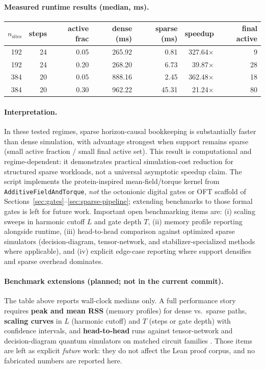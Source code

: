 \documentclass[11pt,a4paper]{article}
\theoremstyle{remark}
\begin{document}
\paragraph{Measured runtime results (median, ms).}
\begin{center}
\begin{tabular}{|r|r|r|r|r|r|r|}
\hline
$n_{\text{sites}}$ & steps & active frac & dense (ms) & sparse (ms) & speedup & final active \\
\hline
192 & 24 & 0.05 & 265.92 & 0.81 & 327.64$\times$ & 9 \\
192 & 24 & 0.20 & 268.20 & 6.73 & 39.87$\times$ & 28 \\
384 & 20 & 0.05 & 888.16 & 2.45 & 362.48$\times$ & 18 \\
384 & 20 & 0.30 & 962.22 & 45.31 & 21.24$\times$ & 80 \\
\hline
\end{tabular}
\end{center}

\paragraph{Interpretation.}
In these tested regimes, sparse horizon-causal bookkeeping is substantially faster than dense simulation, with advantage strongest when support remains sparse (small active fraction / small final active set). This result is computational and regime-dependent: it demonstrates practical simulation-cost reduction for structured sparse workloads, not a universal asymptotic speedup claim. The script implements the protein-inspired mean-field/torque kernel from \texttt{AdditiveFieldAndTorque}, \emph{not} the octonionic digital gates or OFT scaffold of Sections~\ref{sec:gates}--\ref{sec:sparse-pipeline}; extending benchmarks to those formal gates is left for future work.
Important open benchmarking items are: (i) scaling sweeps in harmonic cutoff $L$ and gate depth $T$, (ii) memory profile reporting alongside runtime, (iii) head-to-head comparison against optimized sparse simulators (decision-diagram, tensor-network, and stabilizer-specialized methods where applicable), and (iv) explicit edge-case reporting where support densifies and sparse overhead dominates.

\paragraph{Benchmark extensions (planned; not in the current commit).}
The table above reports wall-clock medians only. A full performance story requires \textbf{peak and mean RSS} (memory profiles) for dense vs.\ sparse paths, \textbf{scaling curves} in $L$ (harmonic cutoff) and $T$ (steps or gate depth) with confidence intervals, and \textbf{head-to-head} runs against tensor-network and decision-diagram quantum simulators on matched circuit families \cite{sparsesim2024,sun2025}. Those items are left as explicit \emph{future} work: they do not affect the Lean proof corpus, and no fabricated numbers are reported here.
\end{document}
